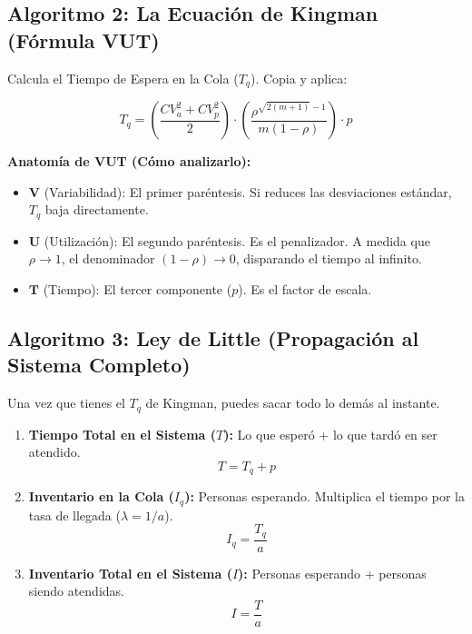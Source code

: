 \subsection{Algoritmo 2: La Ecuación de Kingman (Fórmula VUT)}
Calcula el Tiempo de Espera en la Cola ($T_q$). Copia y aplica:

$$ T_q = \left( \frac{CV_a^2 + CV_p^2}{2} \right) \cdot \left( \frac{\rho^{\sqrt{2(m+1)} - 1}}{m(1-\rho)} \right) \cdot p $$

\textbf{Anatomía de VUT (Cómo analizarlo):}
\begin{itemize}
    \item $\mathbf{V}$ (Variabilidad): El primer paréntesis. Si reduces las desviaciones estándar, $T_q$ baja directamente.
    \item $\mathbf{U}$ (Utilización): El segundo paréntesis. Es el penalizador. A medida que $\rho \rightarrow 1$, el denominador $(1-\rho) \rightarrow 0$, disparando el tiempo al infinito.
    \item $\mathbf{T}$ (Tiempo): El tercer componente ($p$). Es el factor de escala.
\end{itemize}

\subsection{Algoritmo 3: Ley de Little (Propagación al Sistema Completo)}
Una vez que tienes el $T_q$ de Kingman, puedes sacar todo lo demás al instante.

\begin{enumerate}
    \item \textbf{Tiempo Total en el Sistema ($T$):} Lo que esperó + lo que tardó en ser atendido.
    $$ T = T_q + p $$
    \item \textbf{Inventario en la Cola ($I_q$):} Personas esperando. Multiplica el tiempo por la tasa de llegada ($\lambda = 1/a$).
    $$ I_q = \frac{T_q}{a} $$
    \item \textbf{Inventario Total en el Sistema ($I$):} Personas esperando + personas siendo atendidas.
    $$ I = \frac{T}{a} $$
\end{enumerate}

